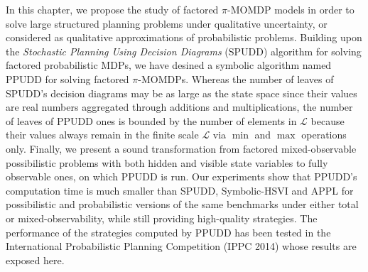 

In this chapter, we propose 
the study of factored $\pi$-MOMDP models 
in order to solve large
structured planning problems 
under qualitative uncertainty, 
or considered
as qualitative approximations of probabilistic problems. 
Building upon the \textit{Stochastic Planning Using Decision Diagrams} (SPUDD)
algorithm for solving factored probabilistic MDPs, 
we have desined a symbolic
algorithm named PPUDD for solving 
factored $\pi$-MOMDPs. Whereas the number of leaves 
of SPUDD's decision diagrams may be 
as large as the state space since their values
are real numbers aggregated through 
additions and multiplications, 
the number of leaves of PPUDD ones
is bounded by the number of elements in $\mathcal{L}$
because their values
always remain in the finite scale $\mathcal{L}$ 
via $\min$ and $\max$ operations only.
Finally,
we present a sound transformation from factored
mixed-observable possibilistic problems with both hidden and visible state
variables to fully observable ones, on which PPUDD is run.
Our experiments show that PPUDD's 
computation time is much smaller than SPUDD,
Symbolic-HSVI and APPL for possibilistic 
and probabilistic versions of the same
benchmarks under either total 
or mixed-observability, while still providing
high-quality strategies. 
The performance of the strategies
computed by PPUDD has been tested
in the International Probabilistic 
Planning Competition (IPPC 2014)
whose results are exposed here.


